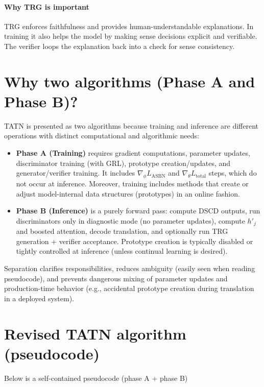 \documentclass[11pt]{article}
\begin{document}
\paragraph{Why TRG is important}
TRG enforces faithfulness and provides human-understandable explanations. In training it also helps the model by making sense decisions explicit and verifiable. The verifier loops the explanation back into a check for sense consistency.

\section{Why two algorithms (Phase A and Phase B)?}
TATN is presented as two algorithms because training and inference are different operations with distinct computational and algorithmic needs:

\begin{itemize}
  \item \textbf{Phase A (Training)} requires gradient computations, parameter updates, discriminator training (with GRL), prototype creation/updates, and generator/verifier training. It includes $\nabla_\phi L_{\text{ASBN}}$ and $\nabla_\theta L_{\text{total}}$ steps, which do not occur at inference. Moreover, training includes methods that create or adjust model-internal data structures (prototypes) in an online fashion.
  \item \textbf{Phase B (Inference)} is a purely forward pass: compute DSCD outputs, run discriminators only in diagnostic mode (no parameter updates), compute $h'_j$ and boosted attention, decode translation, and optionally run TRG generation + verifier acceptance. Prototype creation is typically disabled or tightly controlled at inference (unless continual learning is desired).
\end{itemize}

Separation clarifies responsibilities, reduces ambiguity (easily seen when reading pseudocode), and prevents dangerous mixing of parameter updates and production-time behavior (e.g., accidental prototype creation during translation in a deployed system).

\section{Revised TATN algorithm (pseudocode)}
Below is a self-contained pseudocode (phase A + phase B)
\end{document}
